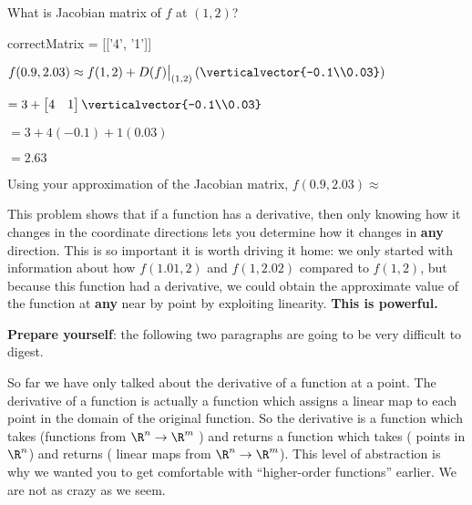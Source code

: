 \documentclass{ximera}
\begin{document}
\begin{question}
\begin{solution}
	What is Jacobian matrix of $f$ at $(1,2)$?
	\begin{matrix-answer}[name = M]
		correctMatrix = [['4', '1']]
	\end{matrix-answer}
\end{solution}

\begin{solution} 
	\begin{hint}
		$f(0.9,2.03) \approx f(1,2) +D(f)\big|_{(1,2)}\left(\verticalvector{-0.1\\0.03}\right)$
	\end{hint}
	\begin{hint}
		$ = 3 + \begin{bmatrix} 4 & 1\end{bmatrix}\verticalvector{-0.1\\0.03}$
	\end{hint}
	\begin{hint}
		$ = 3+4(-0.1)+1(0.03)$
		
		$= 2.63$
	\end{hint}
	Using your approximation of the  Jacobian matrix, $f(0.9,2.03) \approx $ 
\end{solution}
This problem shows that if a function has a derivative, then only knowing how it changes in the coordinate directions lets you determine how it changes in \textbf{any} 
direction.  This is so important it is worth driving it home:  we only started with information about how $f(1.01,2)$ and $f(1,2.02)$ compared to $f(1,2)$, but because
this function had a derivative, we could obtain the approximate value of the function at \textbf{any} near by point by exploiting linearity.  \textbf{This is powerful.}
\end{question}

\textbf{Prepare yourself}:  the following two paragraphs are going to be very difficult to digest.

So far we have only talked about the derivative of a function at a point.  The derivative of a function is actually a function which assigns a linear map
to each point in the domain of the original function.   So the derivative is a function which takes (functions from $\R^n \to \R^m$ ) and 
returns  a function which takes ( points in $\R^n$) and  returns ( linear maps from $\R^n \to \R^m$).    This level of abstraction is why we 
wanted you to get comfortable with ``higher-order functions'' earlier.  We are not as crazy as we seem.
\end{document}
